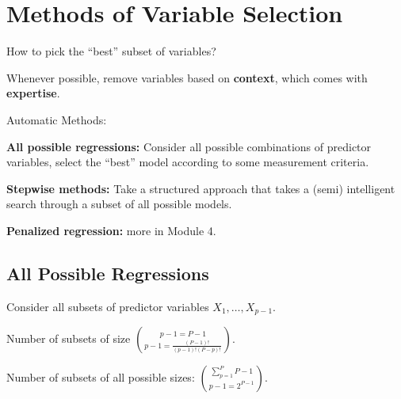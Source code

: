 \documentclass[12pt]{notes}
\begin{document}
\begin{minipage}[l][3cm][c]{\textwidth}

\end{minipage}

\section{Methods of Variable Selection}
How to pick the ``best'' subset of variables? 
\bi
\item Whenever possible, remove variables based on \textbf{context}, which comes with \textbf{expertise}.
\item Automatic Methods:
\bi
\item \textbf{All possible regressions:} Consider all possible combinations of predictor variables, select the ``best'' model according to some measurement criteria.  
\item \textbf{Stepwise methods:} Take a structured approach that takes a (semi) intelligent search through a subset of all possible models. 
\item \textbf{Penalized regression:} more in Module 4. 
\ei 
\ei

\subsection{All Possible Regressions}
Consider all subsets of predictor variables $X_1,  \ldots , X_{p-1}$. 

\bi
\item Number of subsets of size $p-1 = P-1 \choose p-1 = \frac{(P-1)!}{(p-1)!(P-p)!}$.
\item Number of subsets of all possible sizes: $\sum_{p=1}^P P-1 \choose p-1 = 2^{P-1}$.
\ei
\end{document}
